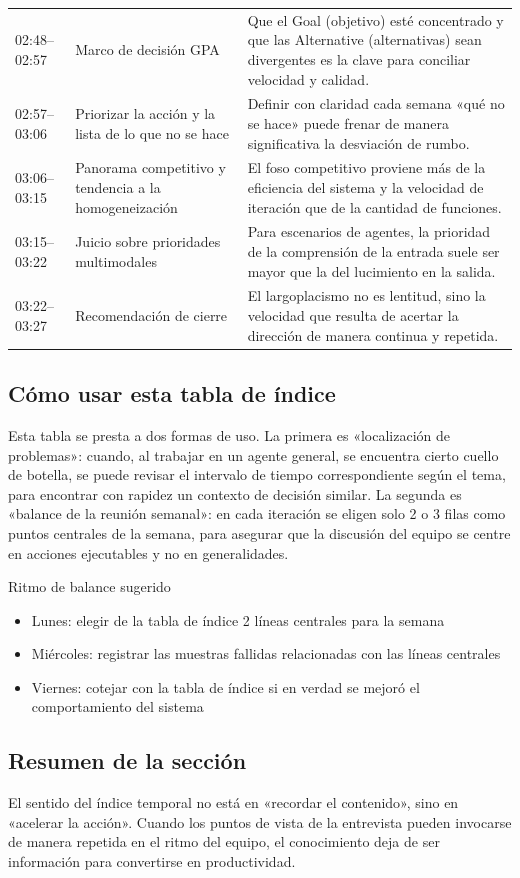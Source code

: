 \begin{longtable}{p{2.6cm}p{4.0cm}p{6.6cm}}
02:48--02:57 & Marco de decisión GPA & Que el Goal (objetivo) esté concentrado y que las Alternative (alternativas) sean divergentes es la clave para conciliar velocidad y calidad. \\
02:57--03:06 & Priorizar la acción y la lista de lo que no se hace & Definir con claridad cada semana «qué no se hace» puede frenar de manera significativa la desviación de rumbo. \\
03:06--03:15 & Panorama competitivo y tendencia a la homogeneización & El foso competitivo proviene más de la eficiencia del sistema y la velocidad de iteración que de la cantidad de funciones. \\
03:15--03:22 & Juicio sobre prioridades multimodales & Para escenarios de agentes, la prioridad de la comprensión de la entrada suele ser mayor que la del lucimiento en la salida. \\
03:22--03:27 & Recomendación de cierre & El largoplacismo no es lentitud, sino la velocidad que resulta de acertar la dirección de manera continua y repetida. \\
\bottomrule
\end{longtable}

\subsection{Cómo usar esta tabla de índice}

Esta tabla se presta a dos formas de uso. La primera es «localización de problemas»: cuando, al trabajar en un agente general, se encuentra cierto cuello de botella, se puede revisar el intervalo de tiempo correspondiente según el tema, para encontrar con rapidez un contexto de decisión similar. La segunda es «balance de la reunión semanal»: en cada iteración se eligen solo 2 o 3 filas como puntos centrales de la semana, para asegurar que la discusión del equipo se centre en acciones ejecutables y no en generalidades.

\begin{importantbox}{Ritmo de balance sugerido}
\begin{itemize}
    \item Lunes: elegir de la tabla de índice 2 líneas centrales para la semana
    \item Miércoles: registrar las muestras fallidas relacionadas con las líneas centrales
    \item Viernes: cotejar con la tabla de índice si en verdad se mejoró el comportamiento del sistema
\end{itemize}
\end{importantbox}

\subsection{Resumen de la sección}

El sentido del índice temporal no está en «recordar el contenido», sino en «acelerar la acción». Cuando los puntos de vista de la entrevista pueden invocarse de manera repetida en el ritmo del equipo, el conocimiento deja de ser información para convertirse en productividad.


